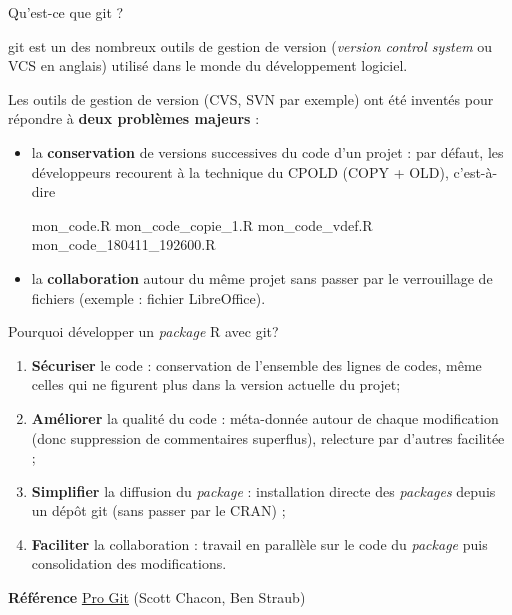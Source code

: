 \documentclass[12pt,handout,ignorenonframetext,]{beamer}
\newenvironment{Shaded}{}{}
\newcommand{\FloatTok}[1]{#1}
\newcommand{\NormalTok}[1]{#1}
\providecommand{\tightlist}{%
  \setlength{\itemsep}{0pt}\setlength{\parskip}{0pt}}
\renewenvironment{Shaded}{\begin{snugshade}}{\end{snugshade}}
\newcommand{\intertitre}[1]{\textbf{\textcolor{redInsee}{#1}}}
\begin{document}
\begin{frame}[fragile]{Qu'est-ce que git ?}

git est un des nombreux outils de gestion de version (\emph{version
control system} ou VCS en anglais) utilisé dans le monde du
développement logiciel.

\bigskip \pause Les outils de gestion de version (CVS, SVN par exemple)
ont été inventés pour répondre à \textbf{deux problèmes majeurs} :

\begin{itemize}
\item
  \pause la \textbf{conservation} de versions successives du code d'un
  projet : par défaut, les développeurs recourent à la technique du
  CPOLD (COPY + OLD), c'est-à-dire

  \pause \footnotesize

\begin{Shaded}
\begin{Highlighting}[]
\NormalTok{mon_code.R}
\NormalTok{mon_code_copie_}\FloatTok{1.}\NormalTok{R}
\NormalTok{mon_code_vdef.R}
\NormalTok{mon_code_180411_}\FloatTok{192600.}\NormalTok{R}
\end{Highlighting}
\end{Shaded}
\end{itemize}

\normalsize

\begin{itemize}
\tightlist
\item
  \pause \vspace{-0.3cm} la \textbf{collaboration} autour du même projet
  sans passer par le verrouillage de fichiers (exemple : fichier
  LibreOffice).
\end{itemize}

\end{frame}

\begin{frame}{Pourquoi développer un \emph{package} R avec git?}

\begin{enumerate}
\def\labelenumi{\arabic{enumi}.}
\item
  \textbf{Sécuriser} le code : conservation de l'ensemble des lignes de
  codes, même celles qui ne figurent plus dans la version actuelle du
  projet;
\item
  \bigskip \pause \textbf{Améliorer} la qualité du code : méta-donnée
  autour de chaque modification (donc suppression de commentaires
  superflus), relecture par d'autres facilitée ;
\item
  \bigskip \pause \textbf{Simplifier} la diffusion du \emph{package} :
  installation directe des \emph{packages} depuis un dépôt git (sans
  passer par le CRAN) ;
\item
  \bigskip \pause \textbf{Faciliter} la collaboration : travail en
  parallèle sur le code du \emph{package} puis consolidation des
  modifications.
\end{enumerate}

\bigskip \pause \intertitre{Référence}
\href{https://link.springer.com/book/10.1007\%2F978-1-4842-0076-6}{\underline{Pro Git}}
(Scott Chacon, Ben Straub)

\end{frame}
\end{document}
